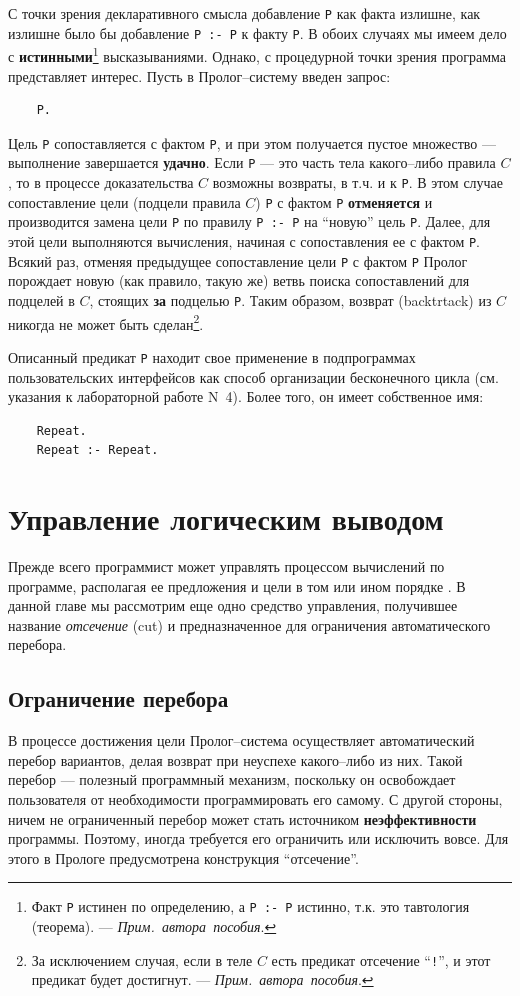\documentclass[12pt, openany, twoside]{book} %
\def\AR{{\em Прим.~автора~пособия}}
\begin{document}
\noindent С точки зрения декларативного смысла добавление {\tt P} как факта излишне, как излишне было бы добавление {\tt P~:-~P} к факту {\tt P}. В обоих случаях мы имеем дело с {\bf истинными}\footnote{Факт {\tt P} истинен по определению, а {\tt P~:-~P} истинно, т.к. это тавтология (теорема). --- \AR.} высказываниями. Однако, с процедурной точки зрения программа представляет интерес. Пусть в Пролог--систему введен запрос:
{\tt\begin{verbatim}
    P.
\end{verbatim}}
\noindent Цель {\tt P} сопоставляется с фактом {\tt P}, и при этом получается пустое множество --- выполнение завершается {\bf удачно}. Если {\tt P} --- это часть тела какого--либо правила $C$, то в процессе доказательства $C$ возможны возвраты, в т.ч. и к {\tt P}. В этом случае сопоставление цели (подцели правила $C$) {\tt P} с фактом {\tt P} {\bf отменяется} и производится замена цели {\tt P} по правилу {\tt P~:-~P} на ``новую'' цель {\tt P}. Далее, для этой цели выполняются вычисления, начиная с сопоставления ее с фактом {\tt P}. Всякий раз, отменяя предыдущее сопоставление цели {\tt P} с фактом {\tt P} Пролог порождает новую (как правило, такую же) ветвь поиска сопоставлений для подцелей в $C$, стоящих {\bf за} подцелью {\tt P}. Таким образом, возврат (backtrtack) из $C$ никогда не может быть сделан\footnote{За исключением случая, если в теле $C$ есть предикат отсечение ``{\tt !}'', и этот предикат будет достигнут. --- \AR.}.

Описанный предикат {\tt P} находит свое применение в подпрограммах пользовательских интерфейсов как способ организации бесконечного цикла (см. указания к лабораторной работе N~4). Более того, он имеет собственное имя:
{\tt\begin{verbatim}
    Repeat.
    Repeat :- Repeat.
\end{verbatim}}


\section{Управление логическим выводом} Прежде всего программист может управлять процессом вычислений по программе, располагая ее предложения и цели в том или ином порядке \cite{Bratko}. В данной главе мы рассмотрим еще одно средство управления, получившее название {\em отсечение} (cut) и предназначенное для ограничения автоматического перебора.

\subsection{Ограничение перебора}
В процессе достижения цели Пролог--система осуществляет автоматический перебор вариантов, делая возврат при неуспехе какого--либо из них. Такой перебор --- полезный программный механизм, поскольку он освобождает пользователя от необходимости программировать его самому. С другой стороны, ничем не ограниченный перебор может стать источником {\bf неэффективности} программы. Поэтому, иногда требуется его ограничить или исключить вовсе. Для этого в Прологе предусмотрена конструкция ``отсечение''.
\end{document}
